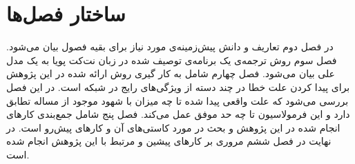 \section{ساختار فصل‌ها}
در فصل دوم تعاریف و دانش پیش‌زمینه‌ی مورد نیاز برای بقیه فصول بیان می‌شود.
فصل سوم روش ترجمه‌ی یک برنامه‌ی توصیف شده در زبان نت‌کت پویا به یک مدل علی بیان می‌شود.
فصل چهارم شامل به کار گیری روش ارائه شده در این پژوهش برای پیدا کردن علت خطا در چند دسته از ویژگی‌های رایج در شبکه است. در این فصل بررسی می‌شود که علت واقعی پیدا شده تا چه میزان با شهود موجود از مساله تطابق دارد و این فرمولاسیون تا چه حد موفق عمل می‌کند.
فصل پنج شامل جمع‌بندی کار‌های انجام شده در این پژوهش و بحث در مورد کاستی‌های آن و کار‌های پیش‌رو است.
در نهایت در فصل ششم مروری بر کار‌های پیشین و مرتبط با این پژوهش انجام شده است.